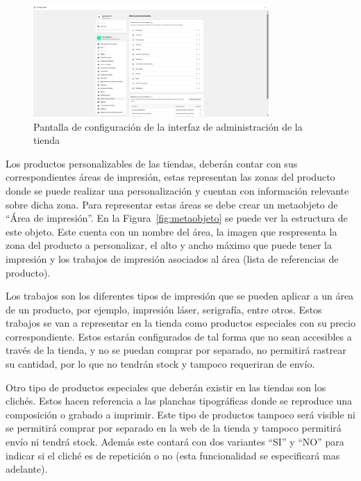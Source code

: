 \documentclass[12pt]{article}
\begin{document}
\begin{figure}[ht]
    \centering
    \includegraphics[width=0.8\textwidth]{imagenesUS2/configuracionAdministradorTienda.png}
    \caption{\label{fig:configuracionMetafields}Pantalla de configuración de la interfaz de administración de la tienda}
    \vspace{\fill}
\end{figure}

Los productos personalizables de las tiendas, deberán contar con sus correspondientes áreas de impresión, estas representan
las zonas del producto donde se puede realizar una personalización y cuentan con información relevante sobre dicha zona.
Para representar estas áreas se debe crear un metaobjeto de ``Área de impresión''. En la Figura~\ref{fig:metaobjeto} se puede ver la estructura de este 
objeto. Este cuenta con un nombre del área, la imagen que respresenta la zona del producto a personalizar, el alto y ancho máximo que puede tener la impresión y 
los trabajos de impresión asociados al área (lista de referencias de producto). 

Los trabajos son los diferentes tipos de impresión que se pueden aplicar a un área de un producto, por ejemplo, impresión láser, serigrafía, entre otros.
Estos trabajos se van a representar en la tienda como productos especiales con su precio correspondiente. Estos estarán configurados de tal forma que no sean accesibles a través de la tienda, y
no se puedan comprar por separado, no permitirá rastrear su cantidad, por lo que no tendrán stock y tampoco requeriran de envío.

Otro tipo de productos especiales que deberán existir en las tiendas son los clichés. Estos hacen referencia a las planchas tipográficas donde se reproduce una composición o grabado
a imprimir. Este tipo de productos tampoco será visible ni se permitirá comprar por separado en la web de la tienda y tampoco permitirá envío  ni tendrá stock.
Además este contará con dos variantes ``SI'' y ``NO'' para indicar si el cliché es de repetición o no (esta funcionalidad se especificará mas adelante).
\end{document}
